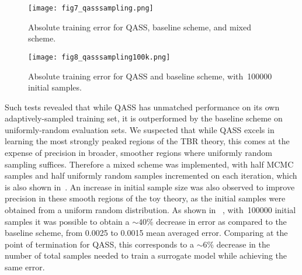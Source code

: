 \begin{figure}
	\centering
	\hspace*{-0.5em}\texttt{[image: fig7\_qasssampling.png]}
	\caption{\label{fig:qasssampling}Absolute training error for QASS, baseline scheme, and mixed scheme.}
\end{figure}

\begin{figure}
	\centering
	\hspace*{-0.5em}\texttt{[image: fig8\_qasssampling100k.png]}
	\caption{\label{fig:qasssampling100k}Absolute training error for QASS and
	baseline scheme, with~\num{100000} initial samples.}
\end{figure}

Such tests revealed that while QASS has unmatched performance on its own
adaptively-sampled training set, it is outperformed by the baseline scheme on
uniformly-random evaluation sets. We suspected that while QASS excels in
learning the most strongly peaked regions of the TBR theory, this comes at the
expense of precision in broader, smoother regions where uniformly random
sampling suffices. Therefore a mixed scheme was implemented, with half MCMC
samples and half uniformly random samples incremented on each iteration, which
is also shown in~. An increase in initial sample size was also observed to improve precision in these smooth regions of the toy theory, as
the initial samples were obtained from a uniform random distribution. As shown
in ~, with~\num{100000} initial samples it was
possible to obtain a ${\sim}40\%$ decrease in error as compared to the baseline
scheme, from 0.0025 to 0.0015 mean averaged error. Comparing at the point of
termination for QASS, this corresponds to a ${\sim}6\%$ decrease in the number
of total samples needed to train a surrogate model while achieving the same error. 


